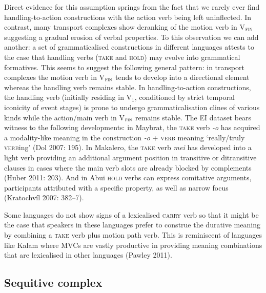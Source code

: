 Direct evidence for this assumption springs from the fact that we rarely ever find handling-to-action constructions with the action verb being left uninflected. In contrast, many transport complexes show deranking of the motion verb in V$_{\textsc{fin}}$ suggesting a gradual erosion of verbal properties. To this observation we can add another: a set of grammaticalised constructions in different languages attests to the case that handling verbs (\textsc{take} and \textsc{hold)} may evolve into grammatical formatives. This seems to suggest the following general pattern: in transport complexes the motion verb in V$_{\textsc{fin}}$ tends to develop into a directional element whereas the handling verb remains stable. In handling-to-action constructions, the handling verb (initially residing in V$_{1}$, conditioned by strict temporal iconicity of event stages) is prone to undergo grammaticalisation clines of various kinds while the action/main verb in V$_{\textsc{fin}}$ remains stable. The EI dataset bears witness to the following developments: in Maybrat, the \textsc{take} verb \textit{-o} has acquired a modality-like meaning in the construction \textit{-o} + \textsc{verb} meaning `really/truly \textsc{verb}ing' (Dol 2007: 195). In Makalero, the \textsc{take} verb \textit{mei} has developed into a light verb providing an additional argument position in transitive or ditransitive clauses in cases where the main verb slots are already blocked by complements (Huber 2011: 203). And in Abui \textsc{hold} verbs can express comitative arguments, participants attributed with a specific property, as well as narrow focus (Kratochvíl 2007: 382--7).

Some languages do not show signs of a lexicalised \textsc{carry} verb so that it might be the case that speakers in these languages prefer to construe the durative meaning by combining a \textsc{take} verb plus motion path verb. This is reminiscent of languages like Kalam where MVCs are vastly productive in providing meaning combinations that are lexicalised in other languages (Pawley 2011). 

\subsection{Sequitive complex} \label{sec:sequitive}

